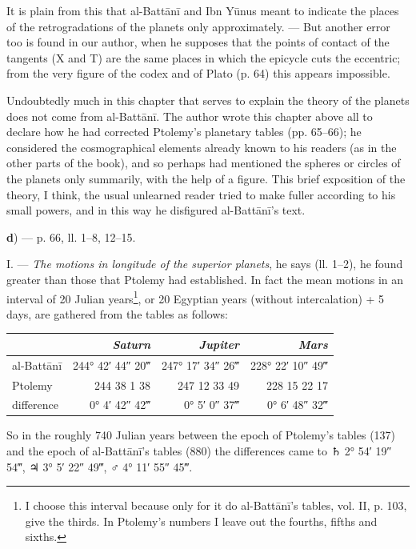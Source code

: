 \documentclass[11pt]{article}
\newcommand{\Pg}[1]{\marginpar{\footnotesize\color{gray}#1}}
\begin{document}
\par It is plain from this that al-Battānī and Ibn Yūnus meant to indicate the places of the retrogradations of the planets only approximately. — But another error too is found in our author, when he supposes that the points of contact of the tangents (X and T) are the same places in which the epicycle cuts the eccentric; from the very figure of the codex and of Plato (p. 64) this appears impossible.\par
\par Undoubtedly much in this chapter that serves to explain the theory of the planets does not come from al-Battānī. The author wrote this chapter above all to declare how he had corrected Ptolemy's planetary tables (pp. 65–66); he considered the cosmographical elements already known to his readers (as in the other parts of the book), and so perhaps had mentioned the spheres or circles of the planets only summarily, with the help of a figure. This brief exposition of the theory, I think, the usual unlearned reader tried to make fuller according to his small powers, and in this way he disfigured al-Battānī's text.\par
\par\begin{center}\Pg{I 239}\textbf{d}) — p. 66, ll. 1–8, 12–15.\end{center}
\par I. — \emph{The motions in longitude of the superior planets}, he says (ll. 1–2), he found greater than those that Ptolemy had established. In fact the mean motions in an interval of 20 Julian years\footnote{I choose this interval because only for it do al-Battānī's tables, vol. II, p. 103, give the thirds. In Ptolemy's numbers I leave out the fourths, fifths and sixths.}, or 20 Egyptian years (without intercalation) + 5 days, are gathered from the tables as follows:\par
\begin{center}\small\begin{tabular}{lrrr}
 & \emph{Saturn} & \emph{Jupiter} & \emph{Mars} \\
\midrule
al-Battānī & 244° 42′ 44″ 20‴ & 247° 17′ 34″ 26‴ & 228° 22′ 10″ 49‴ \\
Ptolemy & 244 38 1 38 & 247 12 33 49 & 228 15 22 17 \\
\midrule
difference & 0° 4′ 42″ 42‴ & 0° 5′ 0″ 37‴ & 0° 6′ 48″ 32‴ \\
\end{tabular}\end{center}
\par So in the roughly 740 Julian years between the epoch of Ptolemy's tables (137) and the epoch of al-Battānī's tables (880) the differences came to {\MoonFont\upshape ♄} 2° 54′ 19″ 54‴, {\MoonFont\upshape ♃} 3° 5′ 22″ 49‴, {\MoonFont\upshape ♂} 4° 11′ 55″ 45‴.\par
\end{document}
